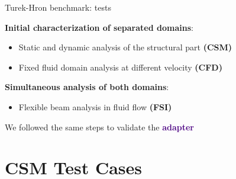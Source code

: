 \documentclass[10pt,t]{beamer}
\begin{document}
\begin{frame}{Turek-Hron benchmark: tests}
    
    \vspace{0.4cm}
    
    \textcolor{fgreen}{\textbf{Initial characterization of separated domains}}:
    
    \vspace{0.4cm}
    
    \begin{itemize}
        \item Static and dynamic analysis of the structural part \textbf{(CSM)}
        \item Fixed fluid domain analysis at different velocity \textbf{(CFD)}
    \end{itemize}

    \vspace{1cm}

    \textcolor{dblue}{\textbf{Simultaneous analysis of both domains}}:

    \vspace{0.4cm}

    \begin{itemize}
        \item Flexible beam analysis in fluid flow \textbf{(FSI)}
    \end{itemize}

    \vspace{1cm}
    
    We followed the same steps to validate the \textcolor{indigo}{\textbf{adapter}}
    
\end{frame}


\section{CSM Test Cases}
\end{document}
